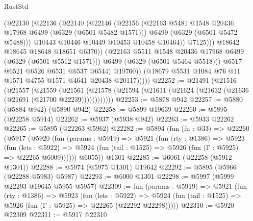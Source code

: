 \begin{lexlean}{RustStd}
\begin{coremodule}
{{                          (@22130
                            (@22136
                              (@22140
                                (@22146
                                  (@22156
                                    (@22163
                                      @5481
                                      @1548
                                      @20436
                                      @17968
                                      @6499
                                      (@6329 (@6501 @5482 @1571)))
                                    @6499
                                    (@6329 (@6501 @5472 @5488)))
                                  @10443
                                  @10446
                                  @10449
                                  @10453
                                  @10458
                                  @10464))
                              @7125)))
                        @18642
                        @18645
                        @18648
                        @18651
                        @6370))
                    (@22163 @5511 @1548 @20436 @17968 @6499 (@6329 (@6501 @5512 @1571)))
                    @6499
                    (@6329 (@6501 @5464 @5518)))
                  @6517
                  @6521
                  @6526
                  @6531
                  @6537
                  @6544)
                @19760))
            (@18679 @5531 @1084 @76 @11 @1571 @4755 @1571 @4641 @20438 @20117)))))
@22252 := @21491
    (@21516
      (@21557
        (@21559
          (@21561 (@21578 (@21594 (@21611 (@21624 (@21632 (@21636 (@21691 (@21700 @22239))))))))))))
@22253 := @5878 @942
@22257 := @5880 (@5884 @942) (@5890 @942)
@22258 := @5899 @19639
@22260 := @5895 (@22258 @5914)
@22262 := @5937 (@5938 @942)
@22263 := @5933 @22262
@22265 := @5895 (@22263 @5962)
@22282 := @5894
    (fun (fn : @33) =>
    @22260
      (@5917
        (@5920
          (fun (params : @5919) =>
          @5921
            (fun (rty : @1386) =>
            @5923
              (fun (lets : @5922) =>
              @5924 (fun (tail : @1525) => @5926 (fun (Γ : @5925) => @22265 @6009))))))
        @6055))
    @1301
@22285 := @6061 (@22258 (@5912 @1301))
@22288 := @5974 (@5975 @1301) @19642
@22292 := @5895 (@5966 (@22288 @5983) @5987)
@22293 := @6000 @1301
@22298 := @5997 (@5999 @22293 @19645 @5955 @5957)
@22309 := fun (params : @5919) =>
  @5921
    (fun (rty : @1386) =>
    @5923
      (fun (lets : @5922) =>
      @5924 (fun (tail : @1525) => @5926 (fun (Γ : @5925) => @22265 (@22292 @22298)))))
@22310 := @5920 @22309
@22311 := @5917 @22310
}}
\end{coremodule}
\end{lexlean}
